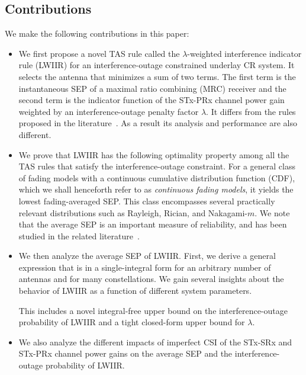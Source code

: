 \documentclass[journal]{IEEEtran}
\newcommand{\lam}{\lambda}
\begin{document}
\subsection{Contributions}
\label{sec:contributions} 
We make the following contributions in this paper:
\begin{itemize}
\item We first propose a novel TAS rule called the $\lam$-weighted interference indicator rule (LWIIR) for an interference-outage constrained underlay CR system. It selects the antenna that minimizes a sum of two terms. The first term is the instantaneous SEP of a maximal ratio combining (MRC) receiver  and the second term is the indicator function of the STx-PRx channel power gain weighted by an interference-outage penalty factor $\lam$. It differs from the rules proposed in the literature~\cite{Hanif_2015_globecom,Sarvendranath_2013_TCOM,Sarvendranath_2014_TCOM,Wang_2011_TCom,Fakhan_2014_TSP}. As a result its analysis and performance are also different.

\item We prove that LWIIR has the following optimality property among all the TAS rules that satisfy the interference-outage constraint.  For a general class of fading models with a continuous cumulative distribution function (CDF), which we shall henceforth refer to as {\em continuous fading models}, it yields the lowest fading-averaged SEP. This class encompasses several practically relevant distributions such as Rayleigh, Rician, and Nakagami-$m$. We note that the average SEP is an important measure of reliability, and has been studied in the related literature~\cite{Fakhan_2014_TSP,Sarvendranath_2013_TCOM,Sarvendranath_2014_TCOM,li_2011_pimrc,Suraweera_2010_TVT}. 


\item We then analyze the average SEP of LWIIR. First, we derive a general expression that is in a single-integral form for an arbitrary number of antennas and for many constellations. We gain several insights about the behavior of LWIIR as a function of different system parameters. 
 
This includes a novel integral-free upper bound on the interference-outage probability of LWIIR and a tight closed-form upper bound for $\lam$.

\item We also analyze the different impacts of imperfect CSI of the STx-SRx and STx-PRx channel power gains on the average SEP and the interference-outage probability of LWIIR.

\end{itemize}
\end{document}
